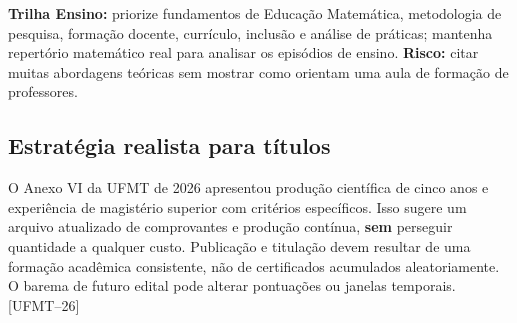 \documentclass[11pt,a4paper]{article}
\newcommand{\fufmt}{\textsf{[UFMT--26]}}
\begin{document}
\textbf{Trilha Ensino:} priorize fundamentos de Educação Matemática, metodologia de pesquisa, formação docente, currículo, inclusão e análise de práticas; mantenha repertório matemático real para analisar os episódios de ensino. \textbf{Risco:} citar muitas abordagens teóricas sem mostrar como orientam uma aula de formação de professores.

\subsection{Estratégia realista para títulos}
O Anexo VI da UFMT de 2026 apresentou produção científica de cinco anos e experiência de magistério superior com critérios específicos. Isso sugere um arquivo atualizado de comprovantes e produção contínua, \textbf{sem} perseguir quantidade a qualquer custo. Publicação e titulação devem resultar de uma formação acadêmica consistente, não de certificados acumulados aleatoriamente. O barema de futuro edital pode alterar pontuações ou janelas temporais. \fufmt
\end{document}
